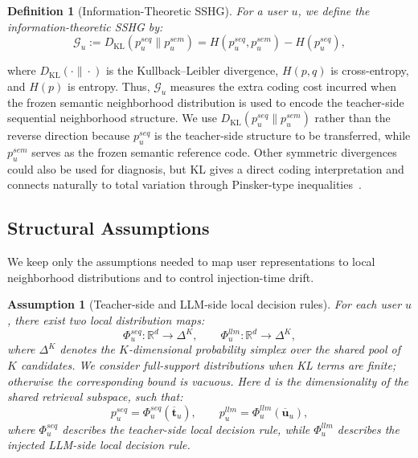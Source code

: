 ﻿\documentclass{article}
\newtheorem{definition}{Definition}[section]
\newtheorem{assumption}{Assumption}[section]
\begin{document}
\begin{definition}[Information-Theoretic SSHG]
\label{def:sshg}
For a user $u$, we define the information-theoretic SSHG by:
\begin{equation}
\mathcal{G}_u
:=
D_{\mathrm{KL}}(p_u^{seq}\|p_u^{sem})
=
H(p_u^{seq},p_u^{sem})-H(p_u^{seq}),
\label{eq:sshg_def}
\end{equation}
\end{definition}
where $D_{\mathrm{KL}}(\cdot\|\cdot)$ is the Kullback--Leibler divergence, $H(p,q)$ is cross-entropy, and $H(p)$ is entropy. Thus, $\mathcal{G}_u$ measures the extra coding cost incurred when the frozen semantic neighborhood distribution is used to encode the teacher-side sequential neighborhood structure. We use $D_{\mathrm{KL}}(p_u^{seq}\|p_u^{sem})$ rather than the reverse direction because $p_u^{seq}$ is the teacher-side structure to be transferred, while $p_u^{sem}$ serves as the frozen semantic reference code. Other symmetric divergences could also be used for diagnosis, but KL gives a direct coding interpretation and connects naturally to total variation through Pinsker-type inequalities~\cite{cover2006elements,csiszar1967information}.

\subsection{Structural Assumptions}
\label{app:theory_assumptions}

We keep only the assumptions needed to map user representations to local neighborhood distributions and to control injection-time drift.

\begin{assumption}[Teacher-side and LLM-side local decision rules]
\label{asm:maps}
For each user $u$, there exist two local distribution maps:
\begin{equation}
\Phi_u^{seq}:\mathbb{R}^d\to\Delta^K,
\qquad
\Phi_u^{llm}:\mathbb{R}^d\to\Delta^K,
\label{eq:two_maps}
\end{equation}
where $\Delta^K$ denotes the $K$-dimensional probability simplex over the shared pool of $K$ candidates. We consider full-support distributions when KL terms are finite; otherwise the corresponding bound is vacuous. Here $d$ is the dimensionality of the shared retrieval subspace,
such that:
\begin{equation}
p_u^{seq}=\Phi_u^{seq}(\overline{\mathbf{t}}_u),
\qquad
p_u^{llm}=\Phi_u^{llm}(\overline{\mathbf{u}}_u),
\label{eq:map_outputs}
\end{equation}
where $\Phi_u^{seq}$ describes the teacher-side local decision rule, while $\Phi_u^{llm}$ describes the injected LLM-side local decision rule.
\end{assumption}
\end{document}
